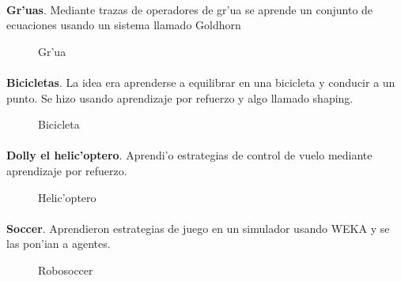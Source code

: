 \documentclass[11pt]{article}
\begin{document}
\paragraph{}
\noindent
\textbf{Gr'uas}. Mediante trazas de operadores de gr'ua se aprende un conjunto de ecuaciones usando un sistema llamado Goldhorn

\begin{figure}[h]

\centering
{}
\caption[Gr'ua]{Gr'ua} 
\label{fig:grua}

\end{figure}

\paragraph{}
\noindent
\textbf{Bicicletas}. La idea era aprenderse a equilibrar en una bicicleta y conducir a un punto. Se hizo usando aprendizaje por refuerzo y algo llamado shaping.

\begin{figure}[h]

\centering
{}
\caption[Bicicleta]{Bicicleta} 
\label{fig:bici}

\end{figure}

\paragraph{}
\noindent
\textbf{Dolly el helic'optero}. Aprendi'o estrategias de control de vuelo mediante aprendizaje por refuerzo.

\begin{figure}[h]

\centering
{}
\caption[Helic'optero]{Helic'optero} 
\label{fig:helicoptero}

\end{figure}


\paragraph{}
\noindent
\textbf{Soccer}. Aprendieron estrategias de juego en un simulador usando WEKA y se las pon'ian a agentes.

\begin{figure}[h]

\centering
{}
\caption[Robosoccer]{Robosoccer} 
\label{fig:robosoc}

\end{figure}
\end{document}

